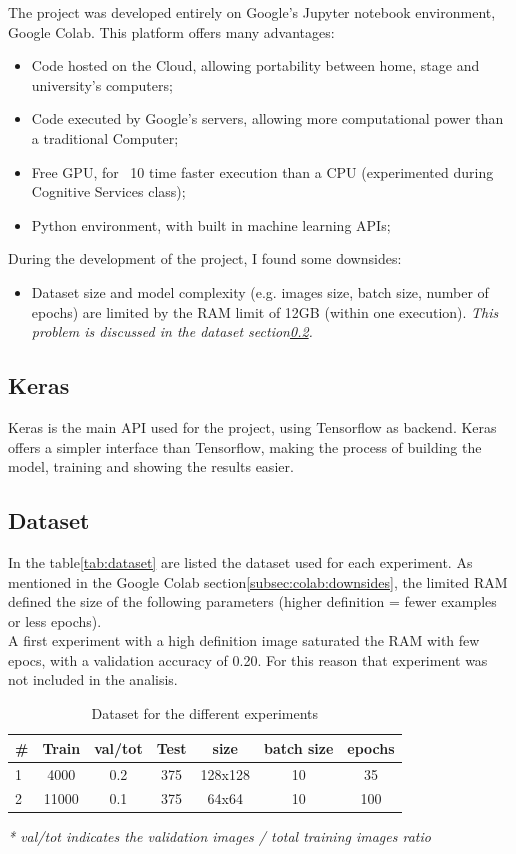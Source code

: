 \documentclass[twocolumn,showpacs,%
  nofootinbib,aps,superscriptaddress,%
  eqsecnum,prd,notitlepage,showkeys,10pt]{revtex4-1}
\begin{document}
The project was developed entirely on Google's Jupyter notebook environment, Google Colab. This platform offers many advantages:\\
\begin{itemize}
    \item Code hosted on the Cloud, allowing portability between home, stage and university's computers;
    \item Code executed by Google's servers, allowing more computational power than a traditional Computer;
    \item Free GPU, for ~10 time faster execution than a CPU (experimented during Cognitive Services class);
    \item Python environment, with built in machine learning APIs;
\end{itemize}
During the development of the project, I found some downsides:\\
\begin{itemize}\label{subsec:colab:downsides}
    \item Dataset size and model complexity (e.g. images size, batch size, number of epochs) are limited by the RAM limit of 12GB (within one execution). \textit{This problem is discussed in the dataset section\ref{subsec:dataset}.}
\end{itemize}

\subsection{Keras}
Keras is the main API used for the project, using Tensorflow as backend. Keras offers a simpler interface than Tensorflow, making the process of building the model, training and showing the results easier.  

\subsection{Dataset}
\label{subsec:dataset}
In the table\ref{tab:dataset} are listed the dataset used for each experiment. As mentioned in the Google Colab section\ref{subsec:colab:downsides}, the limited RAM defined the size of the following parameters (higher definition = fewer examples or less epochs).\\
A first experiment with a high definition image saturated the RAM with few epocs, with a validation accuracy of 0.20. For this reason that experiment was not included in the analisis.
\begin{table}[H] \label{tab:dataset}
    \centering
    \begin{tabular}{l|c|c|c|c|c|c}
    \#         & Train           & val/tot\* & Test       & size       & batch size & epochs \\\hline
    1          &  4000           & 0.2      &  375       &  128x128    & 10   &  35 \\\hline
    2          &  11000          & 0.1      &  375       &  64x64      & 10     &  100
    \end{tabular}
    \caption{\label{tab:widgets}Dataset for the different experiments}
    \end{table}
\textit{* val/tot indicates the validation images / total training images ratio}
\end{document}
